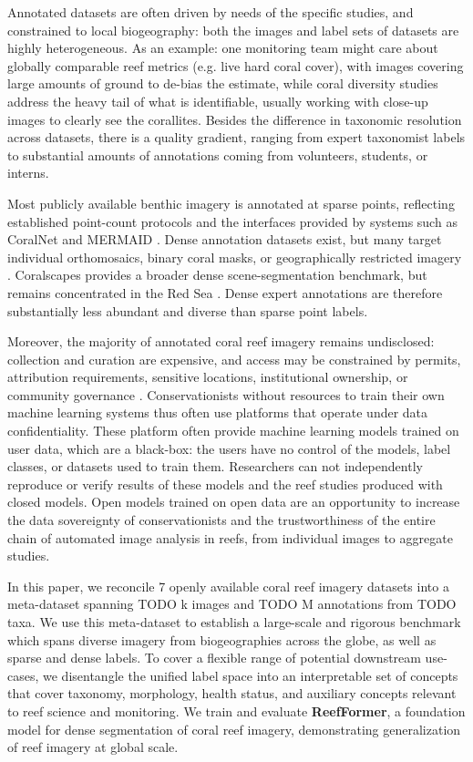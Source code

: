\documentclass[10pt,twocolumn,letterpaper]{article}
\begin{document}
Annotated datasets are often driven by needs of the specific studies, and constrained to local biogeography: both the images and label sets of datasets are highly heterogeneous. As an example: one monitoring team might care about globally comparable reef metrics (e.g. live hard coral cover), with images covering large amounts of ground to de-bias the estimate, while coral diversity studies address the heavy tail of what is identifiable, usually working with close-up images to clearly see the corallites. Besides the difference in taxonomic resolution across datasets, there is a quality gradient, ranging from expert taxonomist labels to substantial amounts of annotations coming from volunteers, students, or interns. 

Most publicly available benthic imagery is annotated at sparse points, reflecting established point-count protocols and the interfaces provided by systems such as CoralNet and MERMAID \citep{beijbom2015towards,chen2021new}. Dense annotation datasets exist, but many target individual orthomosaics, binary coral masks, or geographically restricted imagery \citep{yuval2021repeatable,pavoni2022taglab,sauder2024scalable,zheng2024coralscop}. Coralscapes provides a broader dense scene-segmentation benchmark, but remains concentrated in the Red Sea \citep{sauder2025coralscapes}. Dense expert annotations are therefore substantially less abundant and diverse than sparse point labels.


Moreover, the majority of annotated coral reef imagery remains undisclosed: collection and curation are expensive, and access may be constrained by permits, attribution requirements, sensitive locations, institutional ownership, or community governance \citep{obura2019monitoring}.
Conservationists without resources to train their own machine learning systems thus often use platforms that operate under data confidentiality. These platform often provide machine learning models trained on user data, which are a black-box: the users have no control of the models, label classes, or datasets used to train them. Researchers can not independently reproduce or verify results of these models and the reef studies produced with closed models. 
Open models trained on open data are an opportunity to increase the data sovereignty of conservationists and the trustworthiness of the entire chain of automated image analysis in reefs, from individual images to aggregate studies.

In this paper, we reconcile 7 openly available coral reef imagery datasets into a meta-dataset spanning TODO k images and TODO M annotations from TODO %
taxa. 
We use this meta-dataset to establish a large-scale and rigorous benchmark which spans diverse imagery from biogeographies across the globe, as well as sparse and dense labels. To cover a flexible range of potential downstream use-cases, we disentangle the unified label space into an interpretable set of concepts that cover taxonomy, morphology, health status, and auxiliary concepts relevant to reef science and monitoring. We train and evaluate \textbf{ReefFormer}, a foundation model for dense segmentation of coral reef imagery, demonstrating generalization of reef imagery at global scale.
\end{document}
